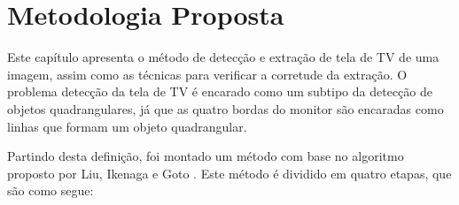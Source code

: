 
\chapter{Metodologia Proposta} \label{met}


Este capítulo apresenta o método de detecção e extração de tela de TV de uma imagem, assim como as técnicas para verificar a corretude da extração. O problema detecção da tela de TV é encarado como um subtipo da detecção de objetos quadrangulares, já que as quatro bordas do monitor são encaradas como linhas que formam um objeto quadrangular.

Partindo desta definição, foi montado um método com base no algoritmo proposto por Liu, Ikenaga e Goto \cite{mrf}. Este método é dividido em quatro etapas, que são como segue:

